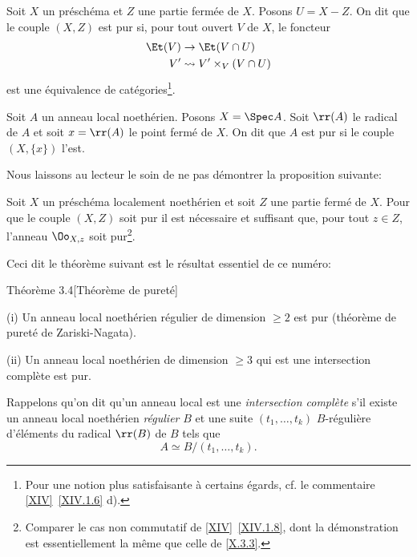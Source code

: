 \begin{definition} \label{X.3.1}
Soit $X$ un pr\'esch\'ema et $Z$ une partie ferm\'ee de $X$. Posons $U=X-Z$. On dit que le couple $(X, Z)$ est pur si, pour tout ouvert $V$ de $X$, le foncteur
\[
\begin{aligned} \Et(V) &\to \Et(V\cap U) \\
V' &\rightsquigarrow V'\times_V(V\cap U)
\end{aligned}
\]
est une \'equivalence de cat\'egories\footnote{Pour une notion plus satisfaisante \`a certains \'egards, cf. le commentaire \ref{XIV}~\ref{XIV.1.6} d).}.
\end{definition}

\begin{definition} \label{X.3.2}
Soit $A$ un anneau local noeth\'erien. Posons $X=\Spec A$. Soit $\rr(A)$ le radical de $A$ et soit $x=\rr(A)$ le point ferm\'e de $X$. On dit que $A$ est pur si le couple $(X, \{x\})$ l'est.
\end{definition}

Nous laissons au lecteur le soin de ne pas d\'emontrer la proposition suivante:

\begin{proposition} \label{X.3.3}
Soit $X$ un pr\'esch\'ema localement noeth\'erien et soit $Z$ une partie ferm\'e de $X$. Pour que le couple $(X, Z)$ soit pur il est n\'ecessaire et suffisant que, pour tout $z\in Z$, l'anneau $\Oo_{X, z}$ soit pur\footnote{Comparer le cas non commutatif de \ref{XIV}~\ref{XIV.1.8}, dont la d\'emonstration est essentiellement la m\^eme que celle de \ref{X.3.3}.}.
\end{proposition}

Ceci dit le th\'eor\`eme suivant est le r\'esultat essentiel de ce num\'ero:

\label{X.3.4}
\begin{enonce*}{Th\'eor\`eme 3.4}[Th\'eor\`eme de puret\'e\ndemark]

\textup{(i)}\enspace
Un anneau local noeth\'erien r\'egulier de dimension $\geq 2$ est pur (th\'eor\`eme de puret\'e de Zariski-Nagata).

\textup{(ii)}\enspace
Un anneau local noeth\'erien de dimension $\geq 3$ qui est une intersection compl\`ete est pur.
\end{enonce*}

Rappelons qu'on dit qu'un anneau local est une \emph{intersection complète} s'il existe un anneau local noeth\'erien \emph{régulier} $B$ et une suite $(t_1, \ldots, t_k)$ $B$-r\'eguli\`ere d'\'el\'ements du radical $\rr(B)$ de $B$ tels que
\[
A \simeq B/(t_1, \ldots, t_k).
\]

